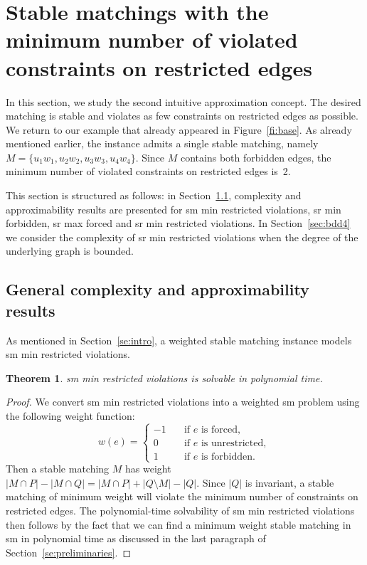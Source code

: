 \documentclass[preprint,12pt]{elsarticle}
\newtheorem{theorem}{Theorem}[section]
\begin{document}
\section{Stable matchings with the minimum number of violated constraints on restricted edges}
\label{se:viol_const}

In this section, we study the second intuitive approximation concept. The desired matching is stable and violates as few constraints on restricted edges as possible. We return to our example that already appeared in Figure~\ref{fi:base}. As already mentioned earlier, the instance admits a single stable matching, namely $M = \{u_1w_1, u_2w_2, u_3w_3, u_4w_4\}$. Since $M$ contains both forbidden edges, the minimum number of violated constraints on restricted edges is~2.

This section is structured as follows: in Section~\ref{sec:gen4}, complexity and approximability results are presented for {\sc sm min restricted violations}, {\sc sr min forbidden}, {\sc sr max forced} and {\sc sr min restricted violations}.  In Section~\ref{sec:bdd4} we consider the complexity of {\sc sr min restricted violations} when the degree of the underlying graph is bounded.

\subsection{General complexity and approximability results}
\label{sec:gen4}
	As mentioned in Section~\ref{se:intro}, a weighted stable matching instance models {\sc sm min restricted violations}.

\begin{theorem}
\label{th:smminrestviol}
	{\sc sm min restricted violations} is solvable in polynomial time.
\end{theorem}

\begin{proof}
We convert {\sc sm min restricted violations} into a weighted {\sc sm} problem using the following weight function:
\[   
w(e) = 
     \begin{cases}
       -1 &\quad\text{if }e\text{ is forced},\\
       0 &\quad\text{if }e\text{ is unrestricted},\\ 
       1 &\quad\text{if }e\text{ is forbidden}.
     \end{cases}
\]
Then a stable matching $M$ has weight $|M \cap P| - |M \cap Q| = |M \cap P| + |Q \setminus M| - |Q|$.  Since $|Q|$ is invariant, a stable matching of minimum weight will violate the minimum number of constraints on restricted edges.  The polynomial-time solvability of {\sc sm min restricted violations} then follows by the fact that we can find a minimum weight stable matching in {\sc sm} in polynomial time as discussed in the last paragraph of Section~\ref{se:preliminaries}.
\end{proof}
\end{document}
